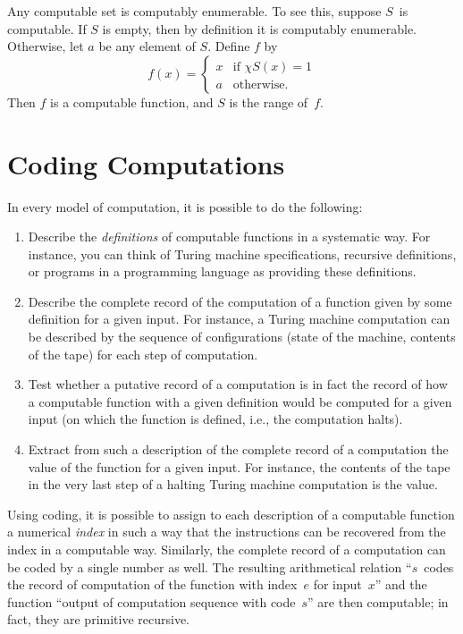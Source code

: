 \documentclass[10pt,a4paper]{article}
\theoremstyle{plain}
\theoremstyle{definition}
\theoremstyle{remark}
\newcommand*{\olfileid}[3]{}
\newcommand*{\olsection}[1]{\section*{#1}}
\providecommand{\Char}{\chi}
\begin{document}
Any computable set is computably enumerable. To see this, suppose
$S$~is computable. If $S$ is empty, then by definition it is
computably enumerable. Otherwise, let $a$ be any element of
$S$. Define $f$ by
\[
f(x) =
\begin{cases}
x & \text{if $\Char{S}(x) = 1$} \\
a & \text{otherwise.}
\end{cases}
\]
Then $f$ is a computable function, and $S$ is the range of~$f$.





\olfileid{cmp}{thy}{cod}
\olsection{Coding Computations}

In every model of computation, it is possible to do the following:
\begin{enumerate}
\item Describe the \emph{definitions} of computable functions in a
  systematic way. For instance, you can think of Turing machine
  specifications, recursive definitions, or programs in a programming
  language as providing these definitions.
\item Describe the complete record of the computation of a function
  given by some definition for a given input. For instance, a Turing
  machine computation can be described by the sequence of
  configurations (state of the machine, contents of the tape) for each
  step of computation.
\item Test whether a putative record of a computation is in fact the
  record of how a computable function with a given definition would be
  computed for a given input (on which the function is
  defined, i.e., the computation halts).
\item Extract from such a description of the complete record of a
  computation the value of the function for a given input. For
  instance, the contents of the tape in the very last step of a
  halting Turing machine computation is the value.
\end{enumerate}

Using coding, it is possible to assign to each description of a
computable function a numerical \emph{index} in such a way that the
instructions can be recovered from the index in a computable way.
Similarly, the complete record of a computation can be coded by a
single number as well. The resulting arithmetical relation ``$s$~codes
the record of computation of the function with index~$e$ for
input~$x$'' and the function ``output of computation sequence with
code~$s$'' are then computable; in fact, they are primitive recursive.
\end{document}
